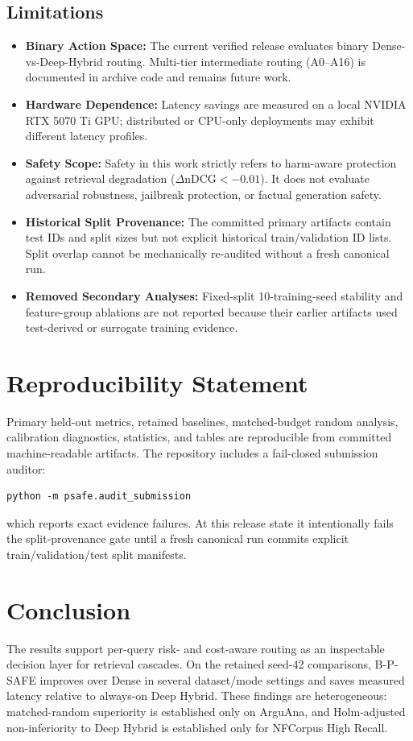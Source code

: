 \documentclass[10pt,journal]{IEEEtran}
\begin{document}
\subsection{Limitations}
\begin{itemize}
    \item \textbf{Binary Action Space:} The current verified release evaluates binary Dense-vs-Deep-Hybrid routing. Multi-tier intermediate routing (A0--A16) is documented in archive code and remains future work.
    \item \textbf{Hardware Dependence:} Latency savings are measured on a local NVIDIA RTX 5070 Ti GPU; distributed or CPU-only deployments may exhibit different latency profiles.
    \item \textbf{Safety Scope:} Safety in this work strictly refers to harm-aware protection against retrieval degradation ($\Delta\text{nDCG} < -0.01$). It does not evaluate adversarial robustness, jailbreak protection, or factual generation safety.
    \item \textbf{Historical Split Provenance:} The committed primary artifacts contain test IDs and split sizes but not explicit historical train/validation ID lists. Split overlap cannot be mechanically re-audited without a fresh canonical run.
    \item \textbf{Removed Secondary Analyses:} Fixed-split 10-training-seed stability and feature-group ablations are not reported because their earlier artifacts used test-derived or surrogate training evidence.
\end{itemize}

\section{Reproducibility Statement}
\label{sec:reproducibility}

Primary held-out metrics, retained baselines, matched-budget random analysis, calibration diagnostics, statistics, and tables are reproducible from committed machine-readable artifacts. The repository includes a fail-closed submission auditor:
\begin{verbatim}
python -m psafe.audit_submission
\end{verbatim}
which reports exact evidence failures. At this release state it intentionally fails the split-provenance gate until a fresh canonical run commits explicit train/validation/test split manifests.

\section{Conclusion}
The results support per-query risk- and cost-aware routing as an inspectable decision layer for retrieval cascades. On the retained seed-42 comparisons, B-P-SAFE improves over Dense in several dataset/mode settings and saves measured latency relative to always-on Deep Hybrid. These findings are heterogeneous: matched-random superiority is established only on ArguAna, and Holm-adjusted non-inferiority to Deep Hybrid is established only for NFCorpus High Recall.



\end{document}
